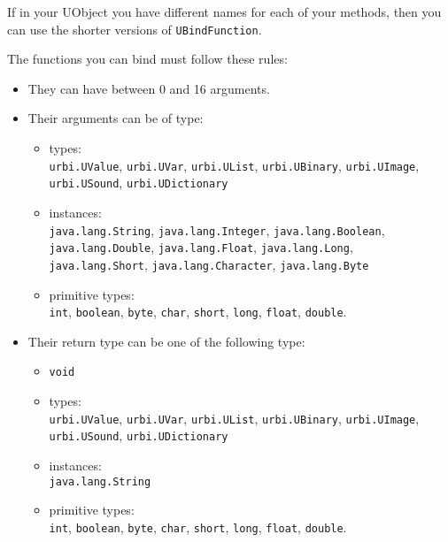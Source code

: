 If in your UObject you have different names for each of your methods, then
you can use the shorter versions of \lstinline{UBindFunction}.

The functions you can bind must follow these rules:
\begin{itemize}
\item They can have between 0 and 16 arguments.
\item Their arguments can be of type:
  \begin{itemize}
  \item \urbi types:\\
    \lstinline{urbi.UValue}, \lstinline{urbi.UVar}, \lstinline{urbi.UList},
    \lstinline{urbi.UBinary}, \lstinline{urbi.UImage},
    \lstinline{urbi.USound}, \lstinline{urbi.UDictionary}
  \item \Java instances:\\
    \lstinline{java.lang.String}, \lstinline{java.lang.Integer},
    \lstinline{java.lang.Boolean}, \lstinline{java.lang.Double},
    \lstinline{java.lang.Float}, \lstinline{java.lang.Long},
    \lstinline{java.lang.Short}, \lstinline{java.lang.Character},
    \lstinline{java.lang.Byte}
  \item \Java primitive types:\\
    \lstinline{int}, \lstinline{boolean}, \lstinline{byte},
    \lstinline{char}, \lstinline{short}, \lstinline{long},
    \lstinline{float}, \lstinline{double}.
  \end{itemize}
\item Their return type can be one of the following type:
  \begin{itemize}
  \item \lstinline{void}
  \item \urbi types:\\
    \lstinline{urbi.UValue}, \lstinline{urbi.UVar}, \lstinline{urbi.UList},
    \lstinline{urbi.UBinary}, \lstinline{urbi.UImage},
    \lstinline{urbi.USound}, \lstinline{urbi.UDictionary}
  \item \Java instances:\\
    \lstinline{java.lang.String}
  \item \Java primitive types:\\
    \lstinline{int}, \lstinline{boolean}, \lstinline{byte},
    \lstinline{char}, \lstinline{short}, \lstinline{long},
    \lstinline{float}, \lstinline{double}.
  \end{itemize}
\end{itemize}


